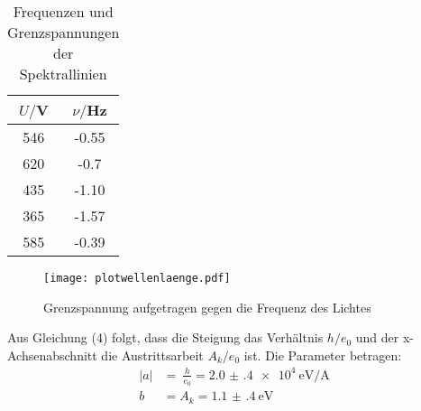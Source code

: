 \begin{table}[H]
  \centering
  \caption{Frequenzen und Grenzspannungen der Spektrallinien}
  \label{tab:Spannungsamplitude}
  \begin{tabular}{c c}
    \toprule
    $U/$V & $\nu/$Hz \\
    \midrule
    546 &     -0.55 \\
    620 &     -0.7 \\
    435 &     -1.10 \\
    365 &     -1.57 \\
    585 &     -0.39 \\
    \bottomrule
  \end{tabular}
\end{table}



\begin{figure}[H]
  \centering
  \texttt{[image: plotwellenlaenge.pdf]}
  \caption{Grenzspannung aufgetragen gegen die Frequenz des Lichtes}
  \label{fig:plotorange}
\end{figure}


Aus Gleichung (4) folgt, dass die
 Steigung  das Verhältnis $h/e_0$ und der x-Achsenabschnitt die Austrittsarbeit $A_k/ e_0$ ist.
Die Parameter betragen:
\begin{align*}
  |a| &=\ \frac{h}{e_0}= \SI{2.0(4)e4}{\eV\per\ampere} \\
  b &= A_k = \SI{1.1(4)}{\eV}
\end{align*}

